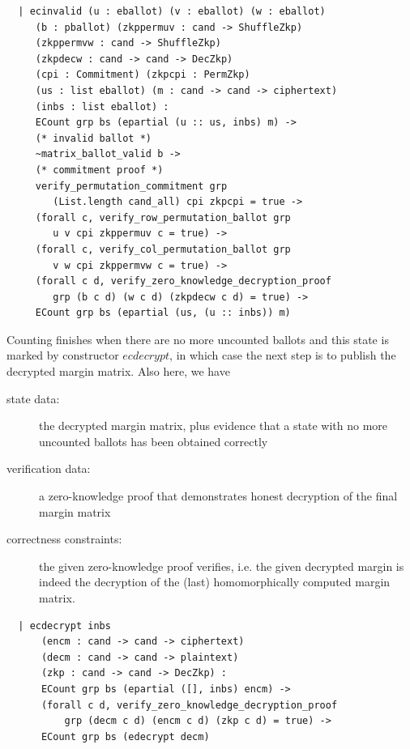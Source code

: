 \begin{verbatim}
  | ecinvalid (u : eballot) (v : eballot) (w : eballot)
     (b : pballot) (zkppermuv : cand -> ShuffleZkp)
     (zkppermvw : cand -> ShuffleZkp)
     (zkpdecw : cand -> cand -> DecZkp)
     (cpi : Commitment) (zkpcpi : PermZkp)
     (us : list eballot) (m : cand -> cand -> ciphertext)
     (inbs : list eballot) :
     ECount grp bs (epartial (u :: us, inbs) m) ->
     (* invalid ballot *)
     ~matrix_ballot_valid b ->
     (* commitment proof *)
     verify_permutation_commitment grp
        (List.length cand_all) cpi zkpcpi = true ->
     (forall c, verify_row_permutation_ballot grp
        u v cpi zkppermuv c = true) ->
     (forall c, verify_col_permutation_ballot grp
        v w cpi zkppermvw c = true) ->
     (forall c d, verify_zero_knowledge_decryption_proof 
        grp (b c d) (w c d) (zkpdecw c d) = true) ->
     ECount grp bs (epartial (us, (u :: inbs)) m)
\end{verbatim}

 

Counting finishes when there are no more uncounted ballots and this state is 
marked by constructor $ecdecrypt$, in
which case the next step is to publish the decrypted margin matrix.
Also here, we have
\begin{description}
  \item[state data:] the decrypted margin matrix, plus evidence
  that a state with no more uncounted ballots has been obtained
  correctly
  \item[verification data:] a zero-knowledge proof that demonstrates
  honest decryption of the final margin matrix
  \item[correctness constraints:] the given zero-knowledge proof
  verifies, i.e. the given decrypted margin is indeed the decryption
  of the (last) homomorphically computed margin matrix.
\end{description} 

 \begin{verbatim}
  | ecdecrypt inbs 
      (encm : cand -> cand -> ciphertext)
      (decm : cand -> cand -> plaintext)
      (zkp : cand -> cand -> DecZkp) :
      ECount grp bs (epartial ([], inbs) encm) ->
      (forall c d, verify_zero_knowledge_decryption_proof
          grp (decm c d) (encm c d) (zkp c d) = true) ->
      ECount grp bs (edecrypt decm)
 \end{verbatim}
 
 
 
